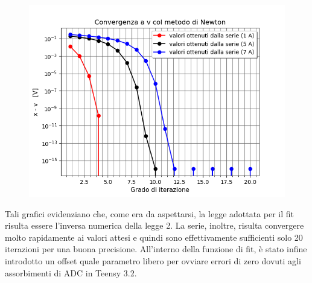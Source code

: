 \documentclass{article}[a4paper, oneside, 11pt]
\begin{document}
\begin{figure}[H]
	\centering 
 		\includegraphics[scale=0.75]{./Figura3_appendiceB.png}
\end{figure}

Tali grafici evidenziano che, come era da aspettarsi, la legge adottata per il fit risulta essere l’inversa numerica della legge 2. La serie, inoltre, risulta convergere molto rapidamente ai valori attesi e quindi sono effettivamente sufficienti solo 20 iterazioni per una buona precisione.
All’interno della funzione di fit, è stato infine introdotto un offset quale parametro libero per ovviare errori di zero dovuti agli assorbimenti di ADC in Teensy 3.2.
\end{document}
